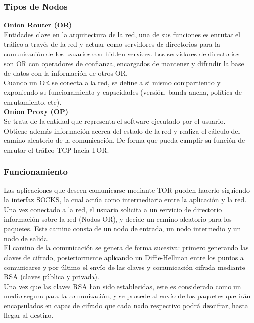\subsubsection {Tipos de Nodos}

\textbf {Onion Router (OR)} \\
Entidades clave en la arquitectura de la red, una de sus funciones es enrutar el tráfico a través de la red y actuar como servidores de directorios para la comunicación de los usuarios con hidden services. Los servidores de directorios son OR con operadores de confianza, encargados de mantener y difundir la base de datos con la información de otros OR. \\

Cuando un OR se conecta a la red, se define a sí mismo compartiendo y exponiendo su funcionamiento y capacidades (versión, banda ancha, política de enrutamiento, etc). \\

\textbf {Onion Proxy (OP)} \\
Se trata de la entidad que representa el software ejecutado por el usuario. Obtiene además información acerca del estado de la red y realiza el cálculo del camino aleatorio de la comunicación. De forma que pueda cumplir su función de enrutar el tráfico TCP hacia TOR.

\subsubsection {Funcionamiento}

Las aplicaciones que deseen comunicarse mediante TOR pueden hacerlo siguiendo la interfaz SOCKS, la cual actúa como intermediaria entre la aplicación y la red. \\

Una vez conectado a la red, el usuario solicita a un servicio de directorio información sobre la red (Nodos OR), y decide un camino aleatorio para los paquetes. Este camino consta de un nodo de entrada, un nodo intermedio y un nodo de salida. \\

El camino de la comunicación se genera de forma sucesiva: primero generando las claves de cifrado, posteriormente aplicando un Diffie-Hellman\cite{WikiDiffieHellman} entre los puntos a comunicarse y por último el envío de las claves y comunicación cifrada mediante RSA\cite{WikiRSA} (claves pública y privada). \\

Una vez que las claves RSA han sido establecidas, este es considerado como un medio seguro para la comunicación, y se procede al envío de los paquetes que irán encapsulados en capas de cifrado que cada nodo respectivo podrá descifrar, hasta llegar al destino. \\ 

